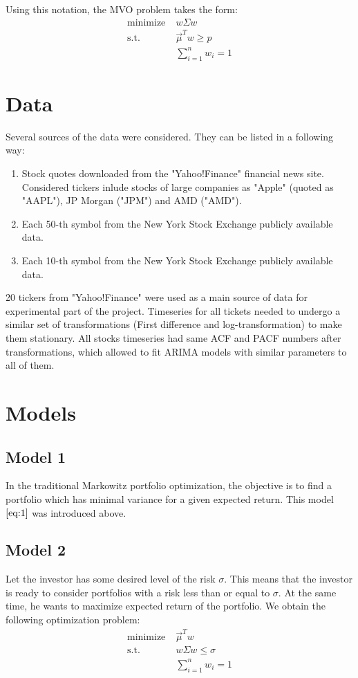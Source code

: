\documentclass{article}
\begin{document}
Using this notation, the MVO problem takes the form:
\begin{align}
\mathrm{minimize} &\;w \Sigma w \nonumber\\
\mathrm{s.t.} &\; \vec{\mu}^T w \geq p \label{eq:1}\\
&\; \sum_{i=1}^n w_i = 1 \nonumber
\end{align}
\section{Data}

Several sources of the data were considered. They can be listed in a following way:

\begin{enumerate}
\item Stock quotes downloaded from the "Yahoo!Finance" financial news site.\\

Considered tickers inlude stocks of large companies as "Apple" (quoted as "AAPL"), JP Morgan ("JPM") and AMD ("AMD").
\item Each 50-th symbol from the New York Stock Exchange publicly available data.\\
\item Each 10-th symbol from the New York Stock Exchange publicly available data. 
\end{enumerate}


20 tickers from "Yahoo!Finance" were used as a main source of data for experimental part of the project. Timeseries for all tickets needed to undergo a similar set of transformations (First difference and log-transformation) to make them stationary. All stocks timeseries had same ACF and PACF numbers after transformations, which allowed to fit ARIMA models with similar parameters to all of them.

\section{Models}
\subsection*{Model 1}
In the traditional Markowitz portfolio optimization, the objective is to find a portfolio which has minimal variance for a given expected return. This model $\ref{eq:1}$ was introduced above. 
\subsection*{Model 2}
Let the investor has some desired level of the risk $\sigma$. This means that the investor is ready to consider portfolios with a risk less than or equal to $\sigma$. At the same time, he wants to maximize expected return of the portfolio. We obtain the following optimization problem:
\begin{align}
\mathrm{minimize} &\; \vec{\mu}^T w \nonumber\\
\mathrm{s.t.} &\; w \Sigma w \leq \sigma \label{eq:2}\\
&\; \sum_{i=1}^n w_i = 1 \nonumber
\end{align}
\end{document}
